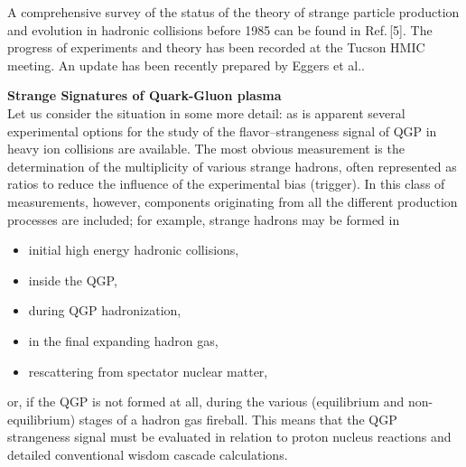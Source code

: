 \begin{mdframed}[linecolor=gray,roundcorner=12pt,backgroundcolor=Dandelion!15,linewidth=1pt,leftmargin=0cm,rightmargin=0cm,topline=true,bottomline=true,skipabove=12pt]
A comprehensive survey of the status of the theory of strange particle production and evolution in hadronic collisions before 1985 can be found in Ref.\,[5]. The progress of experiments and theory has been recorded at the Tucson HMIC meeting\footnotemark[5]. An update has been recently prepared by Eggers et al.\footnotemark[9]. \\[0.5cm]
%
\textbf{\large  Strange Signatures of Quark-Gluon plasma}\\[0.1cm]
Let us consider the situation in some more detail: as is apparent several experimental options for the study of the flavor--strangeness signal of QGP in heavy ion collisions are available. The most obvious measurement is the determination of the multiplicity of various strange hadrons, often represented as ratios to reduce the influence of the experimental bias (trigger). In this class of measurements, however, components originating from all the different production processes are included; for example, strange hadrons may be formed in
\begin{itemize}
\item initial high energy hadronic collisions, 
\item inside the QGP, 
\item during QGP hadronization,
\item in the final expanding hadron gas,
\item rescattering from spectator nuclear matter,
\end{itemize}
or, if the QGP is not formed at all, during the various (equilibrium and non-equilibrium) stages of a hadron gas fireball. This means that the QGP strangeness signal must be evaluated in relation to proton nucleus reactions and detailed conventional wisdom cascade calculations.


\end{mdframed}
